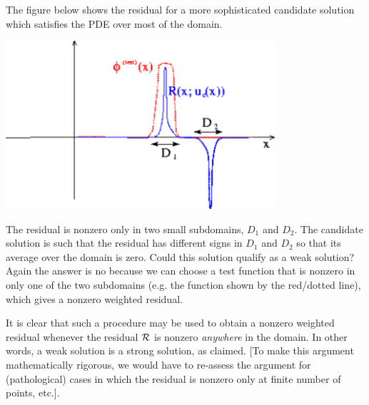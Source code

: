 The figure below shows the residual for a more sophisticated candidate solution which satisfies the P\+DE over most of the domain.  
\begin{DoxyImage}
\includegraphics[width=0.75\textwidth]{weaksoln2}
\end{DoxyImage}
 The residual is nonzero only in two small subdomains, $ D_1$ and $ D_2 $. The candidate solution is such that the residual has different signs in $ D_1$ and $ D_2 $ so that its average over the domain is zero. Could this solution qualify as a weak solution? Again the answer is no because we can choose a test function that is nonzero in only one of the two subdomains (e.\+g. the function shown by the red/dotted line), which gives a nonzero weighted residual.

It is clear that such a procedure may be used to obtain a nonzero weighted residual whenever the residual $ {\cal R} $ is nonzero {\itshape anywhere} in the domain. In other words, a weak solution is a strong solution, as claimed. \mbox{[}To make this argument mathematically rigorous, we would have to re-\/assess the argument for (pathological) cases in which the residual is nonzero only at finite number of points, etc.\mbox{]}.



